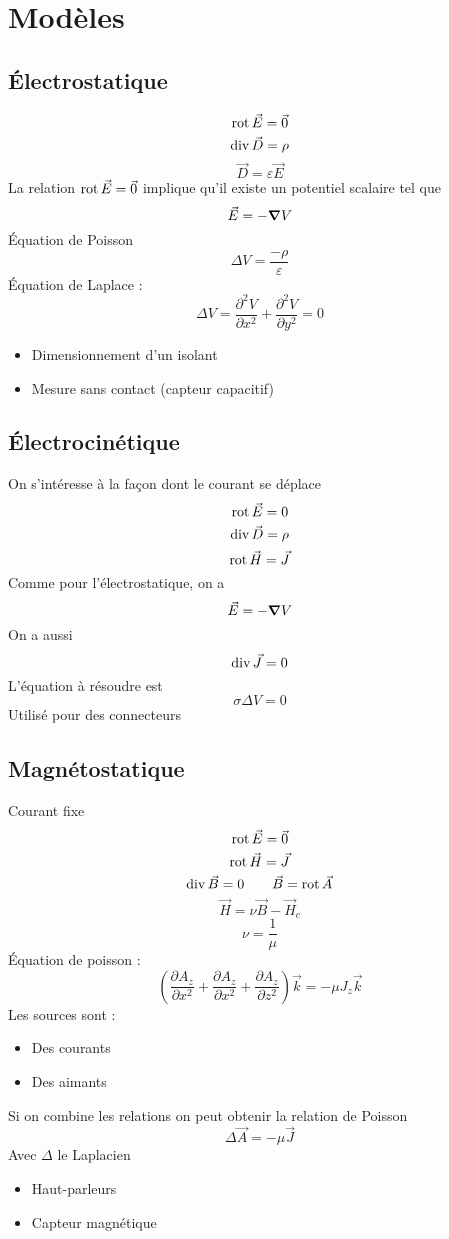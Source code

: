 \documentclass[resume]{subfiles}
\begin{document}
\section{Modèles}
\subsection{Électrostatique}
$$\operatorname{rot}\vec{E}=\vec{0}$$
$$\operatorname{div}\vec{D}=\rho$$
$$\vec{D}=\varepsilon\vec{E}$$
La relation $\operatorname{rot}\vec{E}=\vec{0}$ implique qu'il existe un potentiel scalaire tel que
$$\vec{E}=-\grad V$$
Équation de Poisson
$$\Delta V=\frac{-\rho}{\varepsilon}$$
Équation de Laplace :
$$\Delta V=\frac{\partial^2V}{\partial x^2}+\frac{\partial^2 V}{\partial y^2}=0$$
\begin{itemize}
\item Dimensionnement d'un isolant
\item Mesure sans contact (capteur capacitif)
\end{itemize}

\subsection{Électrocinétique}
On s'intéresse à la façon dont le courant se déplace
$$\operatorname{rot}\vec{E}=0$$
$$\operatorname{div}\vec{D}=\rho$$
$$\operatorname{rot}\vec{H}=\vec{J}$$
Comme pour l'électrostatique, on a
$$\vec{E}=-\grad V$$
On a aussi
$$\operatorname{div}\vec{J}=0$$
L'équation à résoudre est
$$\sigma \Delta V=0$$
Utilisé pour des connecteurs
\subsection{Magnétostatique}
Courant fixe
$$\operatorname{rot}\vec{E}=\vec{0}$$
$$\operatorname{rot}\vec{H}=\vec{J}$$
$$\operatorname{div}\vec{B}=0\qquad \vec{B}=\operatorname{rot}\vec{A}$$
$$\vec{H}=\nu\vec{B}-\vec{H}_c$$
$$\nu=\frac{1}{\mu}$$
Équation de poisson :
$$\left(\frac{\partial A_z}{\partial x^2}+\frac{\partial A_z}{\partial x^2}+\frac{\partial A_z}{\partial z^2}\right)\vec{k}=-\mu J_z\vec{k}$$
Les sources sont :
\begin{itemize}
\item Des courants
\item Des aimants
\end{itemize}
Si on combine les relations on peut obtenir la relation de Poisson
$$\Delta \vec{A}=-\mu \vec{J}$$
Avec $\Delta$ le Laplacien
\begin{itemize}
\item Haut-parleurs
\item Capteur magnétique
\end{itemize}
\end{document}
